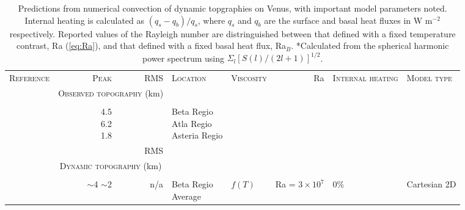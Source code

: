\begin{landscape}
\thispagestyle{empty}

\footnotesize


\begin{longtable}{ @{} p{4cm} r r p{2cm} p{2cm} r p{1.5cm} p{5cm} @{} } 
\caption{Predictions from numerical convection of dynamic topgraphies on Venus, with important model parameters noted. Internal heating is calculated as $(q_s - q_b)/q_s$, where $q_s$ and $q_b$ are the surface and basal heat fluxes in W m$^{-2}$ respectively. Reported values of the Rayleigh number are distringuished between that defined with a fixed temperature contrast, Ra (\ref{eq:Ra}), and that defined with a fixed basal heat flux, Ra$_B$. \;\;  *Calculated from the spherical harmonic power spectrum using $\Sigma_l [S(l)/(2l + 1)]^{1/2}$.} \label{tab:dyn_topo_obvs}\\

\toprule

\textsc{Reference} & \textsc{Peak} & \textsc{RMS} & \textsc{Location} & \textsc{Viscosity} & Ra & \textsc{Internal heating} & \textsc{Model type} \\

\; & \multicolumn{2}{c}{\textsc{Observed topography} (km)} \\
\cline{2-3} \\


\citet{Smrekar1991} & \makecell[tr]{4.5 \\ 6.2 \\ 1.8} &  & \makecell[tl]{Beta Regio \\ Atla Regio \\ Asteria Regio} \\
\citet{Rappaport1999} &  &  RMS &  \\


\; & \multicolumn{2}{c}{\textsc{Dynamic topography} (km)} \\
\cline{2-3} \\


\citet{Solomatov1996a} & \makecell[tl]{$\sim$4 \\ $\sim$2} & n/a  & \makecell[cl]{Beta Regio \\ Average} & $f(T)$  & Ra = $3 \times 10^7$  & 0\% & Cartesian 2D \\


\end{longtable}
\end{landscape}
